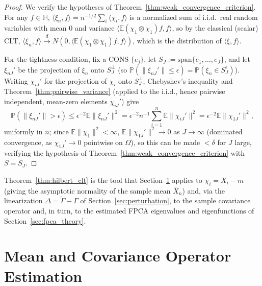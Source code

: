 \begin{proof}
We verify the hypotheses of Theorem~\ref{thm:weak_convergence_criterion}.
For any $f\in\mathbb{H}$, $\langle\xi_n,f\rangle = n^{-1/2}\sum_i\langle
\chi_i,f\rangle$ is a normalized sum of i.i.d.\ real random variables with
mean $0$ and variance $\langle\mathbb{E}(\chi_1\otimes\chi_1)f,f\rangle$,
so by the classical (scalar) CLT, $\langle\xi_n,f\rangle\xrightarrow{d}
N(0,\langle\mathbb{E}(\chi_1\otimes\chi_1)f,f\rangle)$, which is the
distribution of $\langle\xi,f\rangle$.

For the tightness condition, fix a CONS $\{e_j\}$, let $S_J:=
\mathrm{span}\{e_1,\dots,e_J\}$, and let $\xi_{nJ}'$ be the projection of
$\xi_n$ onto $S_J^\perp$ (so $\mathbb{P}(\|\xi_{nJ}'\|\leq\epsilon) =
\mathbb{P}(\xi_n\in S_J^\epsilon)$). Writing $\chi_{iJ}'$ for the
projection of $\chi_i$ onto $S_J^\perp$, Chebyshev's inequality and
Theorem~\ref{thm:pairwise_variance} (applied to the i.i.d., hence pairwise
independent, mean-zero elements $\chi_{iJ}'$) give
\[
\mathbb{P}(\|\xi_{nJ}'\|>\epsilon) \leq \epsilon^{-2}\mathbb{E}\|\xi_{nJ}
'\|^2 = \epsilon^{-2}n^{-1}\sum_{i=1}^n\mathbb{E}\|\chi_{iJ}'\|^2 =
\epsilon^{-2}\mathbb{E}\|\chi_{1J}'\|^2,
\]
uniformly in $n$; since $\mathbb{E}\|\chi_1\|^2<\infty$, $\mathbb{E}
\|\chi_{1J}'\|^2\to 0$ as $J\to\infty$ (dominated convergence, as
$\chi_{1J}'\to 0$ pointwise on $\Omega$), so this can be made $<\delta$
for $J$ large, verifying the hypothesis of
Theorem~\ref{thm:weak_convergence_criterion} with $S=S_J$.
\end{proof}

Theorem~\ref{thm:hilbert_clt} is the tool that
Section~\ref{sec:mean_cov_estimation} applies to $\chi_i=X_i-m$ (giving
the asymptotic normality of the sample mean $\overline{X}_n$) and, via the
linearization $\Delta=\widetilde\Gamma-\Gamma$ of
Section~\ref{sec:perturbation}, to the sample covariance operator and, in
turn, to the estimated FPCA eigenvalues and eigenfunctions of
Section~\ref{sec:fpca_theory}.

\section{Mean and Covariance Operator Estimation}
\label{sec:mean_cov_estimation}

